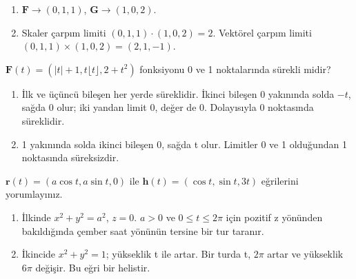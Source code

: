 \begin{tcolorbox}[title={Adım adım çözüm},colback=green!3!white,colframe=green]\begin{enumerate}
\item \(\mathbf F\to(0,1,1)\), \(\mathbf G\to(1,0,2)\).
\item Skaler çarpım limiti \((0,1,1)\cdot(1,0,2)=2\). Vektörel çarpım limiti \((0,1,1)\times(1,0,2)=(2,1,-1)\).
\end{enumerate}\end{tcolorbox}
\begin{tcolorbox}[title={Örnek 3.4 | Tam kısım içeren süreklilik},colframe=accent]\(\mathbf F(t)=(|t|+1,t\lfloor t\rfloor,2+t^2)\) fonksiyonu 0 ve 1 noktalarında sürekli midir?
\par{}\end{tcolorbox}
\begin{tcolorbox}[title={Adım adım çözüm},colback=green!3!white,colframe=green]\begin{enumerate}
\item İlk ve üçüncü bileşen her yerde süreklidir. İkinci bileşen 0 yakınında solda \(-t\), sağda 0 olur; iki yandan limit 0, değer de 0. Dolayısıyla 0 noktasında süreklidir.
\item 1 yakınında solda ikinci bileşen 0, sağda t olur. Limitler 0 ve 1 olduğundan 1 noktasında süreksizdir.
\end{enumerate}\end{tcolorbox}
\begin{tcolorbox}[title={Örnek 3.5 | Çember ve helis},colframe=accent]\(\mathbf r(t)=(a\cos t,a\sin t,0)\) ile \(\mathbf h(t)=(\cos t,\sin t,3t)\) eğrilerini yorumlayınız.
\par{}\end{tcolorbox}
\begin{tcolorbox}[title={Adım adım çözüm},colback=green!3!white,colframe=green]\begin{enumerate}
\item İlkinde \(x^2+y^2=a^2\), \(z=0\). \(a>0\) ve \(0\le t\le2\pi\) için pozitif z yönünden bakıldığında çember saat yönünün tersine bir tur taranır.
\item İkincide \(x^2+y^2=1\); yükseklik t ile artar. Bir turda t, \(2\pi\) artar ve yükseklik \(6\pi\) değişir. Bu eğri bir helistir.
\end{enumerate}\end{tcolorbox}
